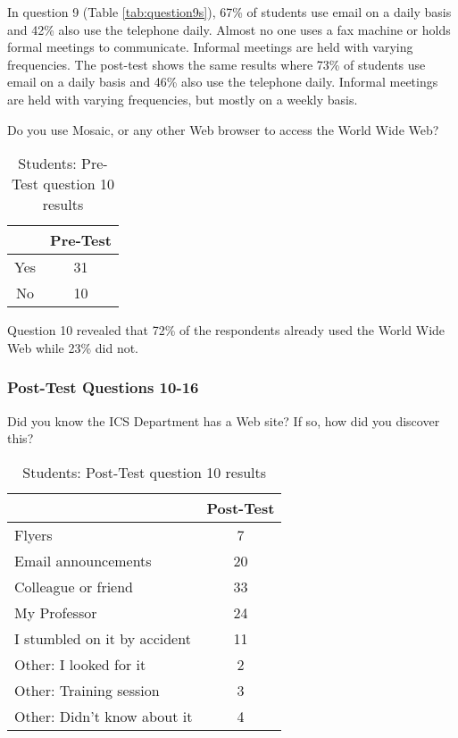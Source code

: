 In question 9 (Table \ref{tab:question9s}), 67\% of students use email on a
daily basis and 42\% also use the telephone daily.  Almost no one uses a fax
machine or holds formal meetings to communicate.  Informal meetings are held
with varying frequencies.  The post-test shows the same results where 73\% of
students use email on a daily basis and 46\% also use the telephone daily.
Informal meetings are held with varying frequencies, but mostly on a weekly
basis.

\begin{table}[htbp]
\caption{Students: Pre-Test question 10 results}
{Do you use Mosaic, or any other Web browser to access the World Wide
  Web?}
\begin{center}
\begin{tabular}{|c|c|} \hline
  & {\bf Pre-Test} \\ \hline 
 Yes & 31 \\ \hline 
 No  & 10 \\ \hline 
\end{tabular}
\end{center}
\label{tab:Prequestion10s}
\end{table}

Question 10 revealed that 72\% of the respondents already used the World Wide Web
while 23\% did not.

\subsubsection{Post-Test Questions 10-16}

\begin{table}[htbp]
\caption{Students: Post-Test question 10 results}
{Did you know the ICS Department has a Web site? If so, how did you
  discover this?}
\begin{center}
\begin{tabular}{|l|c|} \hline
  & {\bf Post-Test} \\ \hline 
 {Flyers} & 7 \\ \hline 
 {Email announcements} & 20 \\ \hline 
 {Colleague or friend} & 33 \\ \hline 
 {My Professor} & 24 \\ \hline 
 {I stumbled on it by accident} & 11 \\ \hline 
 {Other: I looked for it} & 2 \\ \hline 
 {Other: Training session} & 3 \\ \hline 
 {Other: Didn't know about it} & 4 \\ \hline 
\end{tabular}
\end{center}
\label{tab:Postquestion10s}
\end{table}

